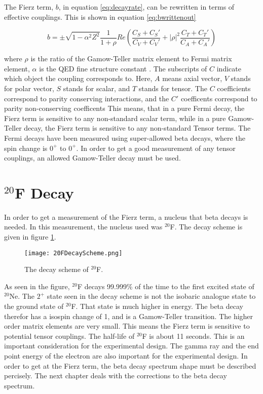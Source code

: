 The Fierz term, $b$, in equation \ref{eq:decayrate}, can be rewritten in terms of effective couplings.
This is shown in equation \ref{eq:bwrittenout}

\begin{equation}
	b =  \pm \sqrt{1 - \alpha^{2}{Z^{2}}}\frac{1}{1 + \rho}Re(\frac{C_{S} + C_{S}'}{C_{V} + C_{V}'} + |\rho|^{2}\frac{C_{T} + C_{T}'}{C_{A} + C_{A}'})
	\label{eq:bwrittenout}
\end{equation}

where $\rho$ is the ratio of the Gamow-Teller matrix element to Fermi matrix element, $\alpha$ is the QED fine structure constant \cite{OSCARPAPER}. 
The subscripts of $C$ indicate which object the coupling corresponds to. 
Here, $A$ means axial vector, $V$ stands for polar vector, $S$ stands for scalar, and $T$ stands for tensor. 
The $C$ coefficients correspond to parity conserving interactions, and the $C'$ coefficents correspond to parity non-conserving coefficents \cite{Lee56}
This means, that in a pure Fermi decay, the Fierz term is sensitive to any non-standard scalar term, while in a pure Gamow-Teller decay, the Fierz term is sensitive to any non-standard Tensor terms. 
The Fermi decays have been measured using super-allowed beta decays, where the spin change is $0^{+}$ to $0^{+}$. 
In order to get a good measurement of any tensor couplings, an allowed Gamow-Teller decay must be used. 

\section{$^{20}$F Decay}
In order to get a measurement of the Fierz term, a nucleus that beta decays is needed.
In this measurement, the nucleus used was $^{20}$F.
The decay scheme is given in figure \ref{fig:DecayScheme}.

\begin{figure}[!htb]
	\centerline{\texttt{[image: 20FDecayScheme.png]}}
	\caption{The decay scheme of $^{20}$F.}
	\label{fig:DecayScheme}
\end{figure}

As seen in the figure, $^{20}$F decays 99.999\% of the time to the first excited state of $^{20}$Ne.
The $2^{+}$ state seen in the decay scheme is not the isobaric analogue state to the ground state of $^{20}$F.
That state is much higher in energy.
The beta decay therefor has a isospin change of 1, and is a Gamow-Teller transition.
The higher order matrix elements are very small.
This means the Fierz term is sensitive to potential tensor couplings.
The half-life of $^{20}$F is about 11 seconds. 
This is an important consideration for the experimental design.
The gamma ray and the end point energy of the electron are also important for the experimental design.
In order to get at the Fierz term, the beta decay spectrum shape must be described percisely.
The next chapter deals with the corrections to the beta decay spectrum.  

